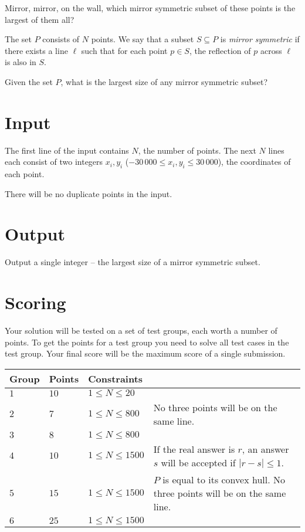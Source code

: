 
Mirror, mirror, on the wall, which mirror symmetric subset of these points is the largest of them all?

The set $P$ consists of $N$ points.
We say that a subset $S \subseteq P$ is \emph{mirror symmetric} if there exists a line $\ell$ such that for each point $p \in S$, the reflection of $p$ across $\ell$ is also in $S$.

Given the set $P$, what is the largest size of any mirror symmetric subset?

\section*{Input}
The first line of the input contains $N$, the number of points.
The next $N$ lines each consist of two integers $x_i, y_i$ ($-30\,000 \le x_i, y_i \le 30\,000$), the coordinates of each point.

There will be no duplicate points in the input.

\section*{Output}
Output a single integer -- the largest size of a mirror symmetric subset.

\section*{Scoring}
Your solution will be tested on a set of test groups, each worth a number of points.
To get the points for a test group you need to solve all test cases in the test group.
Your final score will be the maximum score of a single submission.

\noindent
\begin{tabular}{| l | l | l | l |}
\hline
Group & Points & Constraints \\ \hline
$1$   & $10$   & $1 \leq N \leq 20$ & \\ \hline
$2$   & $7$    & $1 \leq N \leq 800$ & No three points will be on the same line.\\ \hline
$3$   & $8$    & $1 \leq N \leq 800$ & \\ \hline
$4$   & $10$   & $1 \leq N \leq 1500$ & If the real answer is $r$, an answer $s$ will be accepted if $|r-s| \leq 1$.\\ \hline
$5$   & $15$   & $1 \leq N \leq 1500$ & $P$ is equal to its convex hull. No three points will be on the same line.\\ \hline
$6$   & $25$   & $1 \leq N \leq 1500$ & \\ \hline
\end{tabular}
